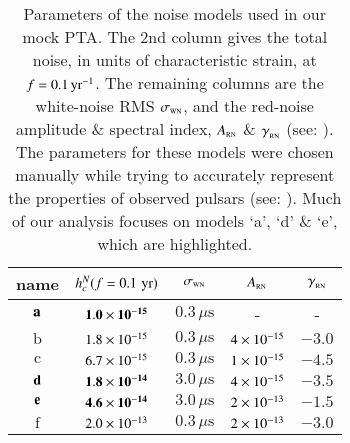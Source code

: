 \documentclass[useAMS, usenatbib]{mnras}  %
\newcommand{\rnamp}{A_\trt{RN}}
\newcommand{\rnind}{{\protect\scalebox{1.1}{\ensuremath{\gamma{}}}_\trt{RN}}}
\newcommand{\wnrms}{\sigma_\trt{WN}}
\newcommand{\micros}{\mu \textrm{s}}
\begin{document}
        \begin{table}
        \begin{center}
        \begin{tabular}{c c c c c}
        name    & $h_c^N(f = 0.1 \, \,\mathrm{yr})$    & $\wnrms$         & $\rnamp$   & $\rnind$ \\ \hline
        $\textrm{\textbf{a}}$     & $\mathbf{1.0\times\nobreak10^{-15}}$               & $0.3 \, \micros$ & -          & -        \\
        $\textrm{b}$     & $1.8\times\nobreak10^{-15}$               & $0.3 \, \micros$ & $4\times\nobreak10^{-15}$ & $-3.0$   \\
        $\textrm{c}$     & $6.7\times\nobreak10^{-15}$               & $0.3 \, \micros$ & $1\times\nobreak10^{-15}$ & $-4.5$   \\
        $\textrm{\textbf{d}}$     & $\mathbf{1.8\times\nobreak10^{-14}}$               & $3.0 \, \micros$ & $4\times\nobreak10^{-15}$ & $-3.5$   \\
        $\textrm{\textbf{e}}$     & $\mathbf{4.6\times\nobreak10^{-14}}$               & $3.0 \, \micros$ & $2\times\nobreak10^{-13}$ & $-1.5$   \\
        $\textrm{f}$     & $2.0\times\nobreak10^{-13}$               & $0.3 \, \micros$ & $2\times\nobreak10^{-13}$ & $-3.0$   \\
        \end{tabular}
        \caption{Parameters of the noise models used in our mock PTA.  The 2nd column gives the total noise, in units of characteristic strain, at $f = 0.1 \, \textrm{yr}^{-1}{}$.  The remaining columns are the white-noise RMS $\wnrms{}$, and the red-noise amplitude \& spectral index, $\rnamp{}$ \& $\rnind{}$ (see: ).  The parameters for these models were chosen manually while trying to accurately represent the properties of observed pulsars (see: ).  Much of our analysis focuses on models `a', `d' \& `e', which are highlighted.}
        \label{tab:noise}
        \end{center}
        \end{table}
\end{document}
